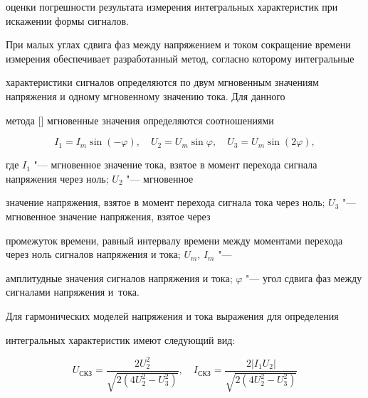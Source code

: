 оценки погрешности результата измерения интегральных характеристик при искажении формы сигналов.



При малых углах сдвига фаз между напряжением и током сокращение времени измерения обеспечивает разработанный метод, согласно которому интегральные

характеристики сигналов определяются по двум мгновенным значениям напряжения и одному мгновенному значению тока. Для данного

метода [] мгновенные значения определяются соотношениями

\[


 I_1 =I_m \sin \left( -\varphi  \right), \quad

 U_2 =U_m \sin \varphi , \quad

 U_3 =U_m \sin \left( 2\varphi \right), 



\]

где $I_{1}$ "--- мгновенное значение тока, взятое в момент перехода сигнала напряжения через ноль; $U_{2}$ "--- мгновенное

значение напряжения, взятое в момент перехода сигнала тока через ноль; $U_{3}$ "--- мгновенное значение напряжения, взятое через

промежуток времени, равный интервалу времени между моментами перехода через ноль сигналов напряжения и тока; $U_m$, $I_m$ "---

амплитудные значения сигналов напряжения и тока; $\varphi$ "--- угол сдвига фаз между сигналами напряжения и~тока.



Для гармонических моделей напряжения и тока выражения для определения

интегральных характеристик имеют следующий вид:

\begin{equation}

\label{mel10:eq1}

U_\text{СКЗ} = \frac{2U_2^2}{\sqrt {2\left( 4U_2^2 -U_3^2 \right)}},\quad


I_\text{СКЗ} =\frac{2|I_1 U_2|}{\sqrt {2\left( 4U_2^2 -U_3^2 \right)}

}

\end{equation}

